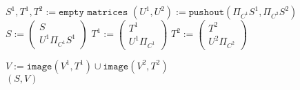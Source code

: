 
	\begin{algorithm}
		\caption{\texttt{$\abst{1} \sqcup \abst{2}$}}\label{euclid}
		\begin{algorithmic}[1]
			\State $\mathit{S^1, T^1, T^2} := \texttt{empty matrices}$
					\State $(U^1, U^2) := \texttt{pushout}(\mathit{\Pi_{C^1}S^1, \Pi_{C^2}S^2})$
					\medskip
					\State $S :=
					 \begin{pmatrix}
						S \\
						\mathit{U^1\Pi_{C^1}S^1}
					\end{pmatrix}$
					\medskip
					\State $T^1 :=
					\begin{pmatrix}
						T^1 \\
						\mathit{U^1\Pi_{C^1}}
					\end{pmatrix}$
					\medskip
					\State $T^2 :=
					\begin{pmatrix}
						T^2 \\
						\mathit{U^2\Pi_{C^2}}
					\end{pmatrix}$									
				\EndFor
			\EndFor
			
			\State $\mathit{V} := \texttt{image}(\mathit{V^1, T^1}) \cup \texttt{image}(\mathit{V^2, T^2})$ \\
			\Return $(S,V)$
		\end{algorithmic}
	\end{algorithm}